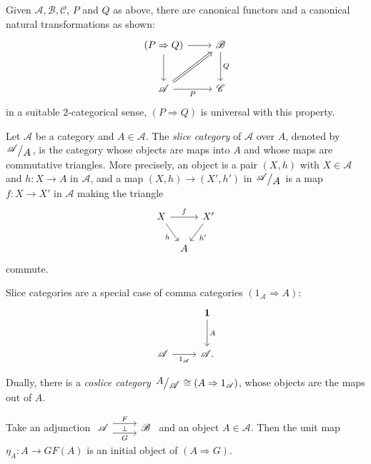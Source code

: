\begin{remark}
  Given $\mathscr{A},\mathscr{B},\mathscr{C}$, $P$ and $Q$ as above, there are canonical functors and a canonical natural transformations as shown:
  \[
    \begin{tikzcd}[row sep=large]
    (P\Rightarrow Q)\arrow[r]\arrow[d]  &\mathscr{B}\arrow[d,"Q"] \\
    \mathscr{A}\arrow[r,"P"']\arrow[ru,Rightarrow]   & \mathscr{C}
  \end{tikzcd}
  \] 
  in a suitable $2$-categorical sense, $(P\Rightarrow Q)$ is universal with this property.
\end{remark}
\begin{definition}
  Let $\mathscr{A}$ be a category and $A\in \mathscr{A}$. The \textit{slice category} of $\mathscr{A}$ over $A$, denoted by $\sfrac{\mathscr{A}}{A}$, is the category whose objects are maps into $A$ and whose maps are commutative triangles. More precisely, an object is a pair $(X,h)$ with $X\in \mathscr{A}$ and $h:X\to A$ in $\mathscr{A}$, and a map $(X,h)\to (X',h')$ in $\sfrac{\mathscr{A}}{A}$ is a map $f:X\to X'$ in $\mathscr{A}$ making the triangle
  \[
    \begin{tikzcd}[column sep=tiny]
    X \arrow[rr,"f"] \arrow[rd,"h"']  & &X'\arrow[ld,"h'"] \\
				      &A&
  \end{tikzcd}
  \]
  commute.
\end{definition}

Slice categories are a special case of comma categories $\left( 1_{\mathscr{A}}\Rightarrow A \right) $:
  \[
    \begin{tikzcd}[row sep=large]
    & \mathscr{\mathbf{1}}\arrow[d,"A"] \\
    \mathscr{A} \arrow[r,"1_{\mathscr{A}}"'] & \mathscr{A}.
  \end{tikzcd}
  \] 
  
  Dually, there is a \textit{coslice category} $\sfrac{A}{\mathscr{A}}\cong (A\Rightarrow 1_{\mathscr{A}})$, whose objects are the maps out of $A$. 

\begin{lemma}
  Take an adjunction $
  \begin{tikzcd}
    \mathscr{A}\arrow[r, shift left=2, "F"]  \arrow[r, shift right=2,"\bot", "G"'] &\mathscr{B}
  \end{tikzcd}$ and an object $A\in \mathscr{A}$. Then the unit map $\eta_A:A\to GF(A)$ is an initial object of $(A\Rightarrow G)$. 
\end{lemma}

